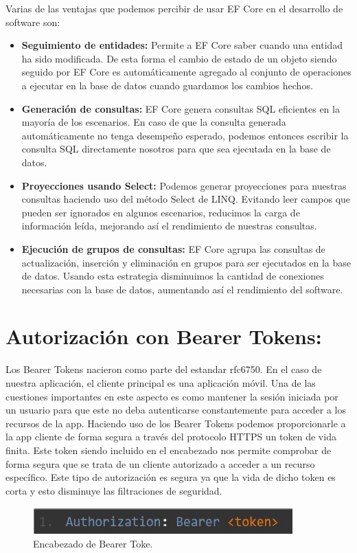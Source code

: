 Varias de las ventajas que podemos percibir de usar EF Core en el desarrollo de software son:

\begin{itemize}
	\item \textbf{Seguimiento de entidades:} Permite a EF Core saber cuando una entidad ha sido modificada. De esta forma el cambio de estado de un objeto siendo seguido por EF Core es automáticamente agregado al conjunto de operaciones a ejecutar en la base de datos cuando guardamos los cambios hechos.
    \item \textbf{Generación de consultas:} EF Core genera consultas SQL eficientes en la mayoría de los escenarios. En caso de que la consulta generada automáticamente no tenga desempeño esperado, podemos entonces escribir la consulta SQL directamente nosotros para que sea ejecutada en la base de datos.
    \item \textbf{Proyecciones usando Select:} Podemos generar proyecciones para nuestras consultas haciendo uso del método Select de LINQ. Evitando leer campos que pueden ser ignorados en algunos escenarios, reducimos la carga de información leída, mejorando así el rendimiento de nuestras consultas.
    \item \textbf{Ejecución de grupos de consultas:} EF Core agrupa las consultas de actualización, inserción y eliminación en grupos para ser ejecutados en la base de datos. Usando esta estrategia disminuimos la cantidad de conexiones necesarias con la base de datos, aumentando así el rendimiento del software.
    
\end{itemize}

\section{Autorización con Bearer Tokens:}
Los Bearer Tokens nacieron como parte del estandar rfc6750.  En el caso de nuestra aplicación, el cliente principal es una aplicación móvil. Una de las cuestiones importantes en este aspecto es como mantener la sesión iniciada por un usuario para que este no deba autenticarse constantemente para acceder a los recursos de la app. Haciendo uso de los Bearer Tokens podemos proporcionarle a la app cliente de forma segura a través del protocolo HTTPS un token de vida finita. Este token siendo incluido en el encabezado nos permite comprobar de forma segura que se trata de un cliente autorizado a acceder a un recurso específico. Este tipo de autorización es segura ya que la vida de dicho token es corta y esto disminuye las filtraciones de seguridad.
\begin{figure}[H]
	\centering
	\includegraphics[width = 10cm]{Graphics/bearer_token.jpg}
	\caption{Encabezado de Bearer Toke. }
	\label{fig:bearer_tokne}
\end{figure}

